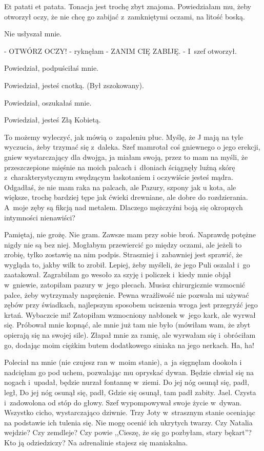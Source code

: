 \documentclass[oneside,polish,12pt,sfheadings]{mwbk}
\begin{document}
Et patati et patata. Tonacja jest trochę zbyt znajoma. Powiedziałam
mu, żeby otworzył oczy, że nie chcę go zabijać z~zamkniętymi oczami,
na litość boską.

Nie usłyszał mnie.

- OTWÓRZ OCZY! - ryknęłam - ZANIM CIĘ ZABIJĘ. - I~szef otworzył.

Powiedział, podpuściłaś mnie.

Powiedział, jesteś cnotką. (Był zszokowany).

Powiedział, oszukałaś mnie.

Powiedział, jesteś Złą Kobietą.

To możemy wyleczyć, jak mówią o~zapaleniu płuc. Myślę, że J mają
na tyle wyczucia, żeby trzymać się z~daleka. Szef mamrotał coś gniewnego
o jego erekcji, gniew wystarczający dla dwojga, ja miałam swoją, przez
to mam na myśli, że przeszczepione mięśnie na moich palcach i~dłoniach
ściągnęły luźną skórę z~charakterystycznym swędzącym łaskotaniem i
oczywiście jesteś mądra. Odgadłaś, że nie mam raka na palcach, ale
Pazury, szpony jak u kota, ale większe, trochę bardziej tępe jak ćwieki
drewniane, ale dobre do rozdzierania. A~moje zęby są fikcją nad metalem.
Dlaczego mężczyźni boją się okropnych intymności nienawiści?

Pamiętaj, nie grożę. Nie gram. Zawsze mam przy sobie broń. Naprawdę
potężne nigdy nie są bez niej. Mogłabym przewiercić go między oczami,
ale jeżeli to zrobię, tylko zostawię na nim podpis. Straszniej i~zabawniej
jest sprawić, że wygląda to, jakby wilk to zrobił. Lepiej, żeby myśleli,
że jego Puli oszalał i~go zaatakował. Zagrabiłam go wesoło za szyję
i policzek i~kiedy mnie objął w~gniewie, zatopiłam pazury w~jego plecach.
Musisz chirurgicznie wzmocnić palce, żeby wytrzymały naprężenie. Pewna
wrażliwość nie pozwala mi używać zębów przy świadkach, najlepszym
sposobem uciszenia wroga jest przegryźć jego krtań. Wybaczcie mi!
Zatopiłam wzmocniony nabłonek w~jego kark, ale wyrwał się. Próbował
mnie kopnąć, ale mnie już tam nie było (mówiłam wam, że zbyt opierają
się na swojej sile). Złapał mnie za ramię, ale wyrwałam się i~obróciłam
go, dodając moim ciężkim butem dodatkowego siniaka na jego nerkach.
Ha, ha!

Poleciał na mnie (nie czujesz ran w~moim stanie), a~ja sięgnęłam dookoła
i nadcięłam go pod uchem, pozwalając mu opryskać dywan. Będzie chwiał
się na nogach i~upadał, będzie nurzał fontannę w~ziemi. Do jej nóg
osunął się, padł, legł, Do jej nóg osunął się, padł, Gdzie się osunął,
tam padł zabity. Jael. Czysta i~zadowolona od stóp do głowy. Szef
wypompowywał swoje życie w~dywan. Wszystko cicho, wystarczająco dziwnie.
Trzy Joty w~strasznym stanie oceniając na podstawie ich tulenia się.
Nie mogę ocenić ich ukrytych twarzy. Czy Natalia wejdzie? Czy zemdleje?
Czy powie ,,Cieszę, że się go pozbyłam, stary bękart''? Kto ją odziedziczy?
Na adrenalinie stajesz się maniakalna. 
\end{document}
